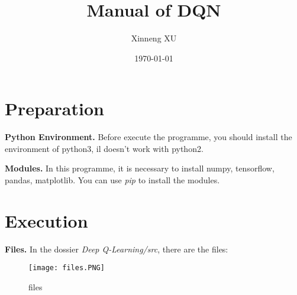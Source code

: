 \documentclass[a4paper,10pt]{article}
\title{Manual of DQN}
\date{\today}
\author{Xinneng XU}
\begin{document}
\maketitle


\section{Preparation}

\textbf{Python Environment.} Before execute the programme, you should install the environment of python3, il doesn't work with python2.

\textbf{Modules.} In this programme, it is necessary to install numpy, tensorflow, pandas, matplotlib. You can use \textit{pip} to install the modules.

\section{Execution}
\textbf{Files.} In the dossier \textit{Deep Q-Learning/src}, there are the files:
\begin{figure}[h]
    \center
    \texttt{[image: files.PNG]}
	\caption{files}
	\label{files}
\end{figure}
\end{document}
